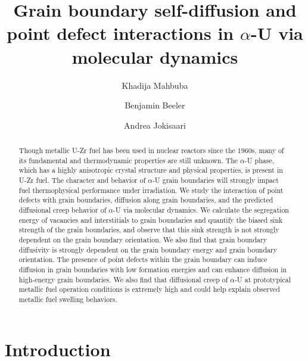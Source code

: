 \documentclass[review]{elsarticle}
\begin{document}
\begin{frontmatter}
\title{Grain boundary self-diffusion and point defect interactions in $\alpha$-U via molecular dynamics}

\author[ncsu]{Khadija Mahbuba}
\author[ncsu,inl]{Benjamin Beeler}
\author[inl]{Andrea Jokisaari}
\address[ncsu]{North Carolina State University, Raleigh, NC 27607}
\address[inl]{Idaho National Laboratory, Idaho Falls, ID 83415}
\begin{abstract}
Though metallic U-Zr fuel has been used in nuclear reactors since the 1960s, many of its fundamental and thermodynamic properties are still unknown. The $\alpha$-U phase, which has a highly anisotropic crystal structure and physical properties, is present in U-Zr fuel. The character and behavior of $\alpha$-U grain boundaries will strongly impact fuel thermophysical performance under irradiation. We study the interaction of point defects with grain boundaries, diffusion along grain boundaries, and the predicted diffusional creep behavior of $\alpha$-U   via molecular dynamics. We calculate the segregation energy of vacancies and interstitials to grain boundaries and quantify the biased sink strength of the grain boundaries, and observe that this sink strength is not strongly dependent on the grain boundary orientation. We also find that grain boundary diffusivity is strongly dependent on the grain boundary energy and grain boundary orientation. The presence of point defects within the grain boundary can induce diffusion in grain boundaries with low formation energies and can enhance diffusion in high-energy grain boundaries. We also find that diffusional creep of $\alpha$-U at prototypical metallic fuel operation conditions is extremely high and could help explain observed metallic fuel swelling behaviors.
\end{abstract}

\end{frontmatter}

\linenumbers
\section{Introduction}
\end{document}
